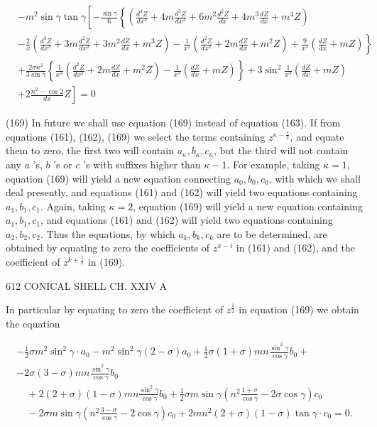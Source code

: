 \[\begin{aligned}
& -m^2 \sin \gamma \tan \gamma\left[-\frac{\sin \gamma}{6}\left\{\left(\frac{d^4 Z}{d x^4}+4 m \frac{d^3 Z}{d x^3}+6 m^2 \frac{d^2 Z}{d x}+4 m^3 \frac{d Z}{d x}+m^4 Z\right)\right.\right. \\
& \left.-\frac{2}{x}\left(\frac{d^3 Z}{d x^3}+3 m \frac{d^2 Z}{d x^2}+3 m^2 \frac{d Z}{d x}+m^3 Z\right)-\frac{1}{x^2}\left(\frac{d^2 Z}{d x^2}+2 m \frac{d Z}{d x}+m^2 Z\right)+\frac{9}{x^3}\left(\frac{d Z}{d x}+m Z\right)\right\} \\
& +\frac{2 \sigma n^2}{3 \sin \gamma}\left\{\frac{1}{x^3}\left(\frac{d^2 Z}{d x^2}+2 m \frac{d Z}{d x}+m^2 Z\right)-\frac{1}{x^3}\left(\frac{d Z}{d x}+m Z\right)\right\}+3 \sin ^2 \frac{1}{x^3}\left(\frac{d Z}{d x}+m Z\right) \\
& \left.+2 \frac{n^2-\cos 2}{d x} Z\right]=0
\end{aligned} \]

(169) In future we shall use equation (169) instead of equation (163). If from
equations (161), (162), (169) we select the terms containing
\(z^{\kappa-\frac{1}{2}}\), and equate them to zero, the first two will
contain \(a_\kappa, b_\kappa, c_\kappa\), but the third will not contain
any \(a\) 's, \(b\) 's or \(c\) 's with suffixes higher than
\(\kappa-1\). For example, taking \(\kappa=1\), equation (169) will
yield a new equation connecting \(a_0, b_0, c_0\), with which we shall
deal presently, and equations (161) and (162) will yield two equations
containing \(a_1, b_1, c_1\). Again, taking \(\kappa=2\), equation (169)
will yield a new equation containing \(a_1, b_1, c_1\), and equations
(161) and (162) will yield two equations containing \(a_2, b_2, c_2\).
Thus the equations, by which \(a_k, b_k, c_k\) are to be determined, are
obtained by equating to zero the coefficients of \(z^{x-i}\) in (161)
and (162), and the coefficient of \(z^{k+\frac{1}{2}}\) in (169).

612 CONICAL SHELL CH. XXIV A

In particular by equating to zero the coefficient of \(z^{\frac{1}{2}}\)
in equation (169) we obtain the equation

\[\begin{array}{c}
-\frac{1}{2} \sigma m^2 \sin ^2 \gamma \cdot a_0-m^2 \sin ^2 \gamma(2-\sigma) a_0+\frac{1}{2} \sigma(1+\sigma) m n \frac{\sin ^2 \gamma}{\cos \gamma} b_0+\\
-2 \sigma(3-\sigma) m n \frac{\sin ^2 \gamma}{\cos \gamma} b_0 \\
\quad+2(2+\sigma)(1-\sigma) m n \frac{\sin ^2 \gamma}{\cos \gamma} b_0+\frac{1}{2} \sigma m \sin \gamma\left(n^2 \frac{1+\sigma}{\cos \gamma}-2 \sigma \cos \gamma\right) c_0 \\
\quad-2 \sigma m \sin \gamma\left(n^2 \frac{3-\sigma}{\cos \gamma}-2 \cos \gamma\right) c_0+2 m n^2(2+\sigma)(1-\sigma) \tan \gamma \cdot c_0=0 .
\end{array}\]

